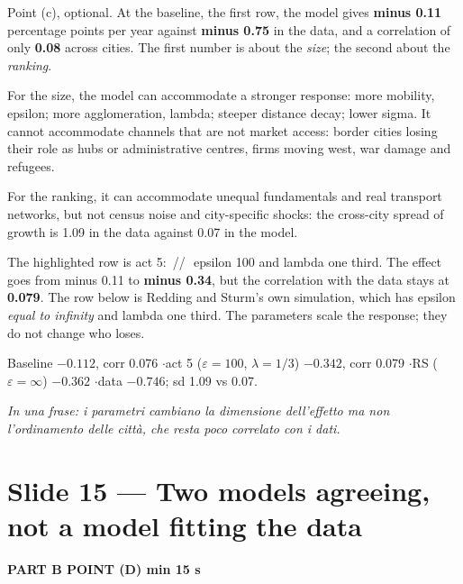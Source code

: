 \documentclass[11pt,a4paper]{article}
\newcommand{\slide}[3]{\Needspace{14\baselineskip}\section{#1}\textcolor{unicared}{\small\bfseries\MakeUppercase{#3}\quad\textperiodcentered\quad #2}\par}
\newcommand{\idea}[1]{\par{\small\itshape\color{unicablue}In una frase: #1}\par}
\newcommand{\pause}{\textcolor{unicared}{\,/\!/\,}}
\begin{document}
\begin{say}
Point (c), optional. At the baseline, the first row, the model gives \textbf{minus 0.11} percentage points per year against \textbf{minus 0.75} in the data, and a correlation of only \textbf{0.08} across cities. The first number is about the \emph{size}; the second about the \emph{ranking}.

For the size, the model can accommodate a stronger response: more mobility, epsilon; more agglomeration, lambda; steeper distance decay; lower sigma. It cannot accommodate channels that are not market access: border cities losing their role as hubs or administrative centres, firms moving west, war damage and refugees.

For the ranking, it can accommodate unequal fundamentals and real transport networks, but not census noise and city-specific shocks: the cross-city spread of growth is 1.09 in the data against 0.07 in the model.

The highlighted row is act 5: \pause\ epsilon 100 and lambda one third. The effect goes from minus 0.11 to \textbf{minus 0.34}, but the correlation with the data stays at \textbf{0.079}. The row below is Redding and Sturm's own simulation, which has epsilon \emph{equal to infinity} and lambda one third. The parameters scale the response; they do not change who loses.
\end{say}

\begin{nums}
Baseline $-0.112$, corr 0.076 \quad$\cdot$\quad act 5 ($\varepsilon=100$, $\lambda=1/3$) $-0.342$, corr 0.079 \quad$\cdot$\quad RS ($\varepsilon=\infty$) $-0.362$ \quad$\cdot$\quad data $-0.746$; sd 1.09 vs 0.07.
\end{nums}
\idea{i parametri cambiano la dimensione dell'effetto ma non l'ordinamento delle città, che resta poco correlato con i dati.}

\slide{Slide 15 --- Two models agreeing, not a model fitting the data}{1 min 15 s}{Part B \textperiodcentered{} point (d)}
\end{document}
